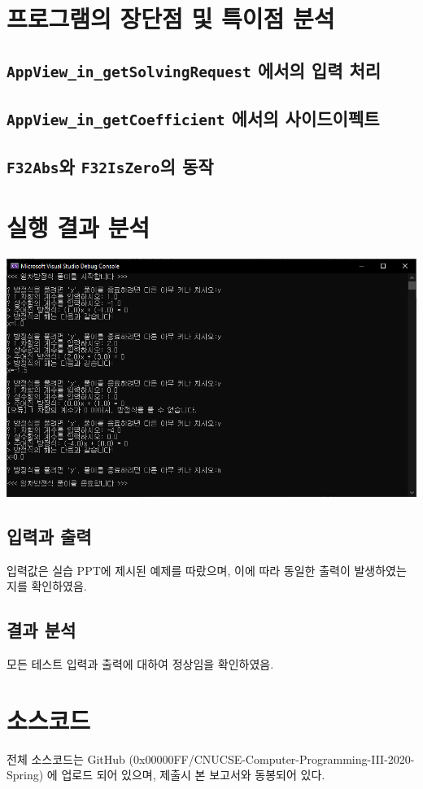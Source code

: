 \documentclass{article}
\begin{document}
    \section{프로그램의 장단점 및 특이점 분석}
    
    \subsection{\texttt{AppView\_in\_getSolvingRequest} 에서의 입력 처리}

    \subsection{\texttt{AppView\_in\_getCoefficient} 에서의 사이드이펙트}

    \subsection{\texttt{F32Abs}와 \texttt{F32IsZero}의 동작}

    \section{실행 결과 분석}

    \includegraphics[width=\textwidth]{test_result.png}

    \subsection{입력과 출력}

    입력값은 실습 PPT에 제시된 예제를 따랐으며, 이에 따라 동일한 출력이 발생하였는 지를 확인하였음.

    \subsection{결과 분석}

    모든 테스트 입력과 출력에 대하여 정상임을 확인하였음. 
    
    \section{소스코드}
    전체 소스코드는 GitHub (0x00000FF/CNUCSE-Computer-Programming-III-2020-Spring) 에 업로드 되어 있으며, 제출시 본 보고서와 동봉되어 있다.
\end{document}
